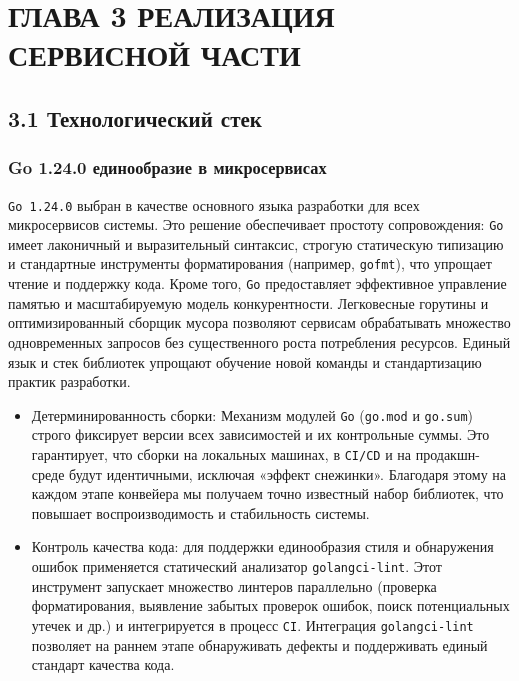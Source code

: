 \section{ГЛАВА 3 РЕАЛИЗАЦИЯ СЕРВИСНОЙ ЧАСТИ}

\subsection*{3.1 Технологический стек}

\subsubsection*{Go 1.24.0 единообразие в микросервисах}
\texttt{Go 1.24.0} выбран в качестве основного языка разработки для всех микросервисов системы. Это решение обеспечивает простоту сопровождения: \texttt{Go} имеет лаконичный и выразительный синтаксис, строгую статическую типизацию и стандартные инструменты форматирования (например, \texttt{gofmt}), что упрощает чтение и поддержку кода. Кроме того, \texttt{Go} предоставляет эффективное управление памятью и масштабируемую модель конкурентности. Легковесные горутины и оптимизированный сборщик мусора позволяют сервисам обрабатывать множество одновременных запросов без существенного роста потребления ресурсов. Единый язык и стек библиотек упрощают обучение новой команды и стандартизацию практик разработки.
\begin{itemize}
    \item Детерминированность сборки: Механизм модулей \texttt{Go} (\texttt{go.mod} и \texttt{go.sum}) строго фиксирует версии всех зависимостей и их контрольные суммы. Это гарантирует, что сборки на локальных машинах, в \texttt{CI/CD} и на продакшн-среде будут идентичными, исключая «эффект снежинки». Благодаря этому на каждом этапе конвейера мы получаем точно известный набор библиотек, что повышает воспроизводимость и стабильность системы.
    \item Контроль качества кода: для поддержки единообразия стиля и обнаружения ошибок применяется статический анализатор \texttt{golangci-lint}. Этот инструмент запускает множество линтеров параллельно (проверка форматирования, выявление забытых проверок ошибок, поиск потенциальных утечек и др.) и интегрируется в процесс \texttt{CI}. Интеграция \texttt{golangci-lint} позволяет на раннем этапе обнаруживать дефекты и поддерживать единый стандарт качества кода.
\end{itemize}

